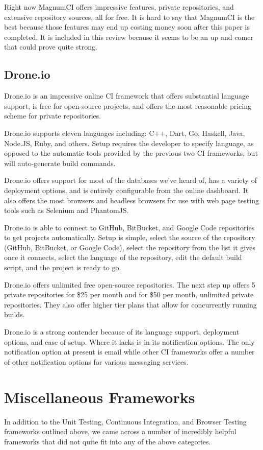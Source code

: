 \documentclass[12pt]{ucthesis}
\begin{document}
Right now MagnumCI offers impressive features, private repositories, and extensive repository sources, all for free. It is hard to say that MagnumCI is the best because those features may end up costing money soon after this paper is completed. It is included in this review because it seems to be an up and comer that could prove quite strong.

\subsection{Drone.io}
Drone.io\cite{DroneIO} is an impressive online CI framework that offers substantial language support, is free for open-source projects, and offers the most reasonable pricing scheme for private repositories.

Drone.io supports eleven languages including: C++, Dart, Go, Haskell, Java, Node.JS, Ruby, and others. Setup requires the developer to specify language, as opposed to the automatic tools provided by the previous two CI frameworks, but will auto-generate build commands.

Drone.io offers support for most of the databases we've heard of, has a variety of deployment options, and is entirely configurable from the online dashboard. It also offers the most browsers and headless browsers for use with web page testing tools such as Selenium and PhantomJS.

Drone.io is able to connect to GitHub, BitBucket, and Google Code repositories to get projects automatically. Setup is simple, select the source of the repository (GitHub, BitBucket, or Google Code), select the repository from the list it gives once it connects, select the language of the repository, edit the default build script, and the project is ready to go.

Drone.io offers unlimited free open-source repositories. The next step up offers 5 private repositories for \$25 per month and for \$50 per month, unlimited private repositories. They also offer higher tier plans that allow for concurrently running builds.

Drone.io is a strong contender because of its language support, deployment options, and ease of setup. Where it lacks is in its notification options. The only notification option at present is email while other CI frameworks offer a number of other notification options for various messaging services.


\section{Miscellaneous Frameworks}
In addition to the Unit Testing, Continuous Integration, and Browser Testing frameworks outlined above, we came across a number of incredibly helpful frameworks that did not quite fit into any of the above categories.
\end{document}

